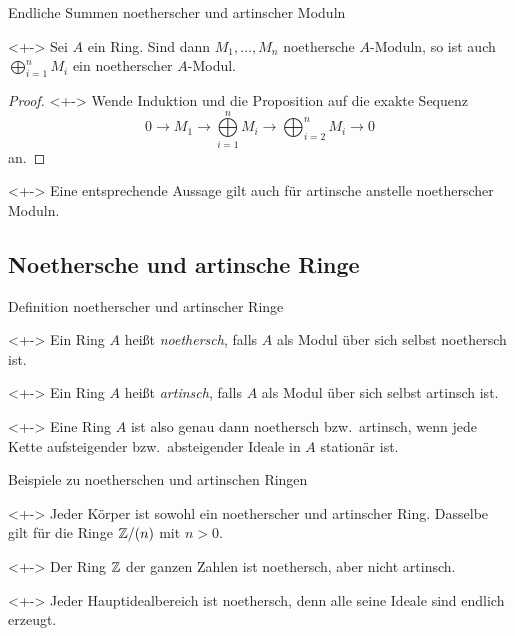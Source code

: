 \begin{frame}{Endliche Summen noetherscher und artinscher Moduln}
	\begin{corollary}<+->
		Sei \(A\) ein Ring. Sind dann \(M_1, \dotsc, M_n\) noethersche \(A\)-Moduln,
		so ist auch \(\bigoplus\limits_{i = 1}^n M_i\) ein noetherscher \(A\)-Modul.
	\end{corollary}
	\begin{proof}<+->
		Wende Induktion und die Proposition auf die exakte Sequenz
		\[
			0 \to M_1 \to \bigoplus\limits_{i = 1}^n M_i \to \bigoplus_{i = 2}^n M_i \to 0
		\]
		an.
	\end{proof}
	\begin{remark}<+->
		Eine entsprechende Aussage gilt auch für artinsche anstelle noetherscher Moduln.
	\end{remark}
\end{frame}

\subsection{Noethersche und artinsche Ringe}

\begin{frame}{Definition noetherscher und artinscher Ringe}
	\begin{definition}<+->
		Ein Ring \(A\) heißt \emph{noethersch}, falls \(A\) als Modul über sich selbst
		noethersch ist.
	\end{definition}
	\begin{definition}<+->
		Ein Ring \(A\) heißt \emph{artinsch}, falls \(A\) als Modul über sich selbst
		artinsch ist.
	\end{definition}
	\begin{remark}<+->
		Eine Ring \(A\) ist also genau dann noethersch bzw.~artinsch, wenn jede Kette aufsteigender
		bzw.~absteigender Ideale in \(A\) stationär ist.
	\end{remark}
\end{frame}

\begin{frame}{Beispiele zu noetherschen und artinschen Ringen}
	\begin{example}<+->
		Jeder Körper ist sowohl ein noetherscher und artinscher Ring. Dasselbe gilt für die
		Ringe \(\mathbb Z/(n)\) mit \(n > 0\).
	\end{example}
	\begin{example}<+->
		Der Ring \(\mathbb Z\) der ganzen Zahlen ist noethersch, aber nicht artinsch.
	\end{example}
	\begin{example}<+->
		Jeder Hauptidealbereich ist noethersch, denn alle seine Ideale sind endlich erzeugt.
	\end{example}
\end{frame}

